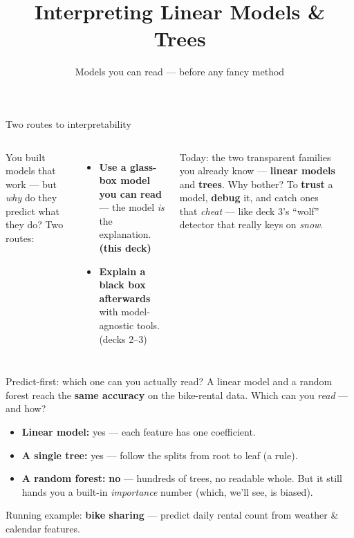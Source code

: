 \documentclass[aspectratio=169]{beamer}
\title{Interpreting Linear Models \& Trees}
\subtitle{Models you can read --- before any fancy method}
\date{}
\begin{document}
\begin{frame}{Two routes to interpretability}
  \begin{columns}[T]
    You built models that work --- but \emph{why} do they predict what they do?
    \vskip 6pt
    Two routes:
    \begin{itemize}\small
      \item \textbf{Use a glass-box model you can read} --- the model \emph{is} the explanation.
        \textbf{(this deck)}
      \item \textbf{Explain a black box afterwards} with model-agnostic tools. (decks 2--3)
    \end{itemize}
    \vskip 6pt
    Today: the two transparent families you already know --- \textbf{linear models} and
    \textbf{trees}.
    \vskip 4pt
    \footnotesize Why bother? To \textbf{trust} a model, \textbf{debug} it, and catch ones that
    \emph{cheat} --- like deck 3's ``wolf'' detector that really keys on \emph{snow}.
    \begin{center}
    \end{center}
  \end{columns}
\end{frame}

\begin{frame}{Predict-first: which one can you actually read?}
  A linear model and a random forest reach the \textbf{same accuracy} on the bike-rental data.
  Which can you \emph{read} --- and how?
  \vfill
  \pause
  \begin{itemize}\small
    \item \textbf{Linear model:} yes --- each feature has one coefficient.
    \item \textbf{A single tree:} yes --- follow the splits from root to leaf (a rule).
    \item \textbf{A random forest:} \textbf{no} --- hundreds of trees, no readable whole. But it
      still hands you a built-in \emph{importance} number (which, we'll see, is biased).
  \end{itemize}
  \vfill
  \footnotesize Running example: \textbf{bike sharing} --- predict daily rental count from weather
  \& calendar features.
\end{frame}
\end{document}
